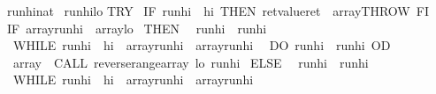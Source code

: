 \begin{isabellebody}
\ run{\isacharunderscore}hi{\isacharcolon}{\isacharcolon}nat\ \isanewline
{\isachardoublequoteopen}\isanewline
{\isasymacute}run{\isacharunderscore}hi{\isacharcolon}{\isacharequal}{\isacharequal}{\isasymacute}lo{\isacharplus}{}{\isacharsemicolon}{\isacharsemicolon}\isanewline
TRY\isanewline
\ IF\ {\isasymacute}run{\isacharunderscore}hi\ {\isacharequal}\ {\isasymacute}hi\ THEN\ {\isasymacute}ret{\isacharunderscore}value{\isacharcolon}{\isacharequal}{\isacharequal}{}{\isacharsemicolon}{\isacharsemicolon}{\isasymacute}ret\ {\isacharcolon}{\isacharequal}{\isacharequal}\ {\isasymacute}array{\isacharsemicolon}{\isacharsemicolon}THROW\ FI{\isacharsemicolon}{\isacharsemicolon}\isanewline
\ IF\ {\isasymacute}array{\isacharbang}{\isasymacute}run{\isacharunderscore}hi\ {\isacharless}\ {\isasymacute}array{\isacharbang}{\isasymacute}lo\isanewline
\ THEN\isanewline
\ \ {\isasymacute}run{\isacharunderscore}hi\ {\isacharcolon}{\isacharequal}{\isacharequal}\ {\isasymacute}run{\isacharunderscore}hi{\isacharplus}{}{\isacharsemicolon}{\isacharsemicolon}\isanewline
\ \ WHILE\ {\isacharparenleft}{\isasymacute}run{\isacharunderscore}hi\ {\isacharless}\ {\isasymacute}hi\ {\isacharampersand}\ {\isasymacute}array{\isacharbang}{\isasymacute}run{\isacharunderscore}hi\ {\isacharless}\ {\isasymacute}array{\isacharbang}{\isacharparenleft}{\isasymacute}run{\isacharunderscore}hi{\isacharminus}{}{\isacharparenright}{\isacharparenright}\isanewline
\ \ DO\ {\isasymacute}run{\isacharunderscore}hi\ {\isacharcolon}{\isacharequal}{\isacharequal}\ {\isasymacute}run{\isacharunderscore}hi{\isacharplus}{}\ OD{\isacharsemicolon}{\isacharsemicolon}\isanewline
\ \ {\isasymacute}array\ {\isacharcolon}{\isacharequal}{\isacharequal}\ CALL\ reverse{\isacharunderscore}range{\isacharparenleft}{\isasymacute}array{\isacharcomma}\ {\isasymacute}lo{\isacharcomma}\ {\isasymacute}run{\isacharunderscore}hi{\isacharparenright}\isanewline
\ ELSE\isanewline
\ \ {\isasymacute}run{\isacharunderscore}hi\ {\isacharcolon}{\isacharequal}{\isacharequal}\ {\isasymacute}run{\isacharunderscore}hi{\isacharplus}{}{\isacharsemicolon}{\isacharsemicolon}\isanewline
\ \ WHILE\ {\isacharparenleft}{\isasymacute}run{\isacharunderscore}hi\ {\isacharless}\ {\isasymacute}hi\ {\isacharampersand}\ {\isasymacute}array{\isacharbang}{\isasymacute}run{\isacharunderscore}hi\ {\isasymge}\ {\isasymacute}array{\isacharbang}{\isacharparenleft}{\isasymacute}run{\isacharunderscore}hi{\isacharminus}{}{\isacharparenright}{\isacharparenright}\isanewline

\end{isabellebody}
